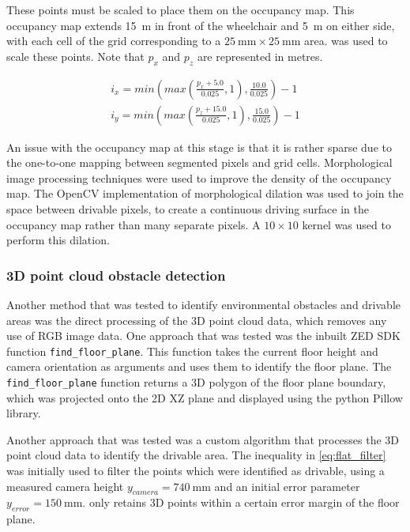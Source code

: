 These points must be scaled to place them on the occupancy map. This occupancy map
extends \SI{15}{\metre} in front of the wheelchair and \SI{5}{\metre} on either side,
with each cell of the grid corresponding to a $\SI{25}{\milli\metre}\times \SI{25}{\milli\metre}$ area.
 was used to scale these points. Note that $p_x$ and $p_z$ are
represented in metres.

\begin{equation}
\begin{split}
i_x = min\left(max\left(\frac{p_x + 5.0}{0.025}, 1\right), \frac{10.0}{0.025}\right) - 1\\
i_y = min\left(max\left(\frac{p_z + 15.0}{0.025}, 1\right), \frac{15.0}{0.025}\right) - 1
\end{split}
\label{eq:occupancy_scaling}
\end{equation}

An issue with the occupancy map at this stage is that it is rather sparse
due to the one-to-one mapping between segmented pixels and grid cells.
Morphological image processing techniques were used to improve the density of the occupancy map.
The OpenCV \cite{bradskiOpenCVLibrary2000} implementation of morphological dilation was used to
join the space between drivable pixels, to create a continuous driving surface in the occupancy map
rather than many separate pixels. A $10\times 10$ kernel was used to perform this dilation.

\pagebreak
\subsubsection{3D point cloud obstacle detection}
\label{sec:point_cloud_obstacle_detection}

Another method that was tested to identify environmental obstacles and drivable areas
was the direct processing of the 3D point cloud data, which removes any use of RGB image data.
One approach that was tested was the inbuilt ZED SDK function \texttt{find\_floor\_plane}.
This function takes the current floor height and camera orientation as arguments
and uses them to identify the floor plane. The \texttt{find\_floor\_plane} function
returns a 3D polygon of the floor plane boundary, which was projected onto the 2D XZ plane
and displayed using the python Pillow library.

Another approach that was tested was a custom algorithm that processes the 3D point cloud data
to identify the drivable area.
The inequality in \cref{eq:flat_filter} was initially used to filter the points
which were identified as drivable,
using a measured camera height $y_{camera} = \SI{740}{\milli\metre}$
and an initial error parameter $y_{error} = \SI{150}{\milli\metre}$.
 only retains 3D points within a certain error margin of the floor plane.

